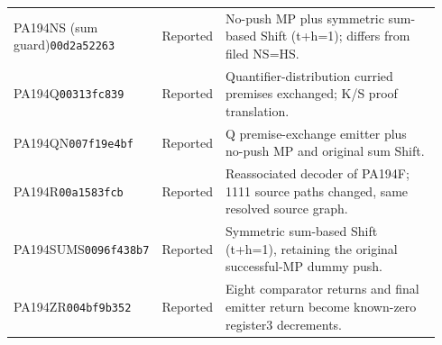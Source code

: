 \begin{longtable}{@{}p{0.245\linewidth}p{0.14\linewidth}p{0.55\linewidth}@{}}
PA194NS (sum guard)\newline\texttt{00d2a52263} & Reported & No-push MP plus symmetric sum-based Shift (t+h=1); differs from filed NS=HS. \\[2pt]
PA194Q\newline\texttt{00313fc839} & Reported & Quantifier-distribution curried premises exchanged; K/S proof translation. \\[2pt]
PA194QN\newline\texttt{007f19e4bf} & Reported & Q premise-exchange emitter plus no-push MP and original sum Shift. \\[2pt]
PA194R\newline\texttt{00a1583fcb} & Reported & Reassociated decoder of PA194F; 1111 source paths changed, same resolved source graph. \\[2pt]
PA194SUMS\newline\texttt{0096f438b7} & Reported & Symmetric sum-based Shift (t+h=1), retaining the original successful-MP dummy push. \\[2pt]
PA194ZR\newline\texttt{004bf9b352} & Reported & Eight comparator returns and final emitter return become known-zero register3 decrements. \\[2pt]
\bottomrule\end{longtable}
\normalsize
